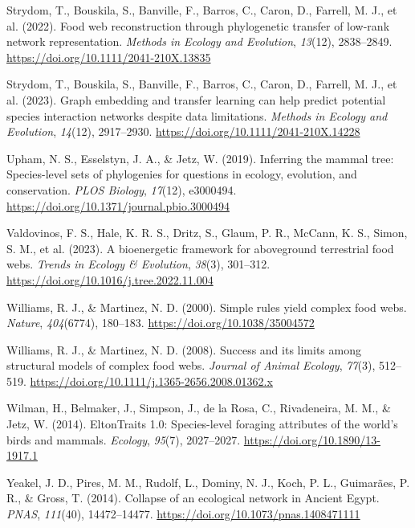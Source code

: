\documentclass[
]{agujournal2019}
\newlength{\cslhangindent}
\newenvironment{CSLReferences}[2] %
 {\begin{list}{}{%
  \setlength{\itemindent}{0pt}
  \setlength{\leftmargin}{0pt}
  \setlength{\parsep}{0pt}
  \ifodd #1
   \setlength{\leftmargin}{\cslhangindent}
   \setlength{\itemindent}{-1\cslhangindent}
  \fi
  \setlength{\itemsep}{#2\baselineskip}}}
 {\end{list}}
\begin{document}
\begin{CSLReferences}{1}{0}
Strydom, T., Bouskila, S., Banville, F., Barros, C., Caron, D., Farrell,
M. J., et al. (2022). Food web reconstruction through phylogenetic
transfer of low-rank network representation. \emph{Methods in Ecology
and Evolution}, \emph{13}(12), 2838--2849.
\url{https://doi.org/10.1111/2041-210X.13835}

Strydom, T., Bouskila, S., Banville, F., Barros, C., Caron, D., Farrell,
M. J., et al. (2023). Graph embedding and transfer learning can help
predict potential species interaction networks despite data limitations.
\emph{Methods in Ecology and Evolution}, \emph{14}(12), 2917--2930.
\url{https://doi.org/10.1111/2041-210X.14228}

Upham, N. S., Esselstyn, J. A., \& Jetz, W. (2019). Inferring the mammal
tree: {Species-level} sets of phylogenies for questions in ecology,
evolution, and conservation. \emph{PLOS Biology}, \emph{17}(12),
e3000494. \url{https://doi.org/10.1371/journal.pbio.3000494}

Valdovinos, F. S., Hale, K. R. S., Dritz, S., Glaum, P. R., McCann, K.
S., Simon, S. M., et al. (2023). A bioenergetic framework for
aboveground terrestrial food webs. \emph{Trends in Ecology \&
Evolution}, \emph{38}(3), 301--312.
\url{https://doi.org/10.1016/j.tree.2022.11.004}

Williams, R. J., \& Martinez, N. D. (2000). Simple rules yield complex
food webs. \emph{Nature}, \emph{404}(6774), 180--183.
\url{https://doi.org/10.1038/35004572}

Williams, R. J., \& Martinez, N. D. (2008). Success and its limits among
structural models of complex food webs. \emph{Journal of Animal
Ecology}, \emph{77}(3), 512--519.
\url{https://doi.org/10.1111/j.1365-2656.2008.01362.x}

Wilman, H., Belmaker, J., Simpson, J., de la Rosa, C., Rivadeneira, M.
M., \& Jetz, W. (2014). {EltonTraits} 1.0: {Species-level} foraging
attributes of the world's birds and mammals. \emph{Ecology},
\emph{95}(7), 2027--2027. \url{https://doi.org/10.1890/13-1917.1}

Yeakel, J. D., Pires, M. M., Rudolf, L., Dominy, N. J., Koch, P. L.,
Guimarães, P. R., \& Gross, T. (2014). Collapse of an ecological network
in {Ancient Egypt}. \emph{PNAS}, \emph{111}(40), 14472--14477.
\url{https://doi.org/10.1073/pnas.1408471111}

\end{CSLReferences}
\end{document}
